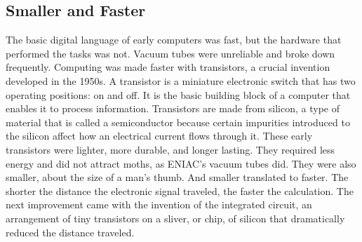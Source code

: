 \documentclass[12pt]{article}
\begin{document}
\subsection {\textbf {Smaller and Faster}}
\large
The basic digital language of early computers was fast, but the hardware that performed the tasks was not. Vacuum tubes were unreliable and broke down frequently. Computing was made faster with transistors, a crucial invention developed in the 1950s. A transistor is a miniature electronic switch that has two operating positions: on and off. It is the basic building block of a computer that enables it to process information. Transistors are made from silicon, a type of material that is called a semiconductor because certain impurities introduced to the silicon affect how an electrical current flows through it. These early transistors were lighter, more durable, and longer lasting. They required less energy and did not attract moths, as ENIAC’s vacuum tubes did. They were also smaller, about the size of a man’s thumb. And smaller translated to faster. The shorter the distance the electronic signal traveled, the faster the calculation. The next improvement came with the invention of the integrated circuit, an arrangement of tiny transistors on a sliver, or chip, of silicon that dramatically reduced the distance traveled.
\newpage
\Huge
\end{document}

